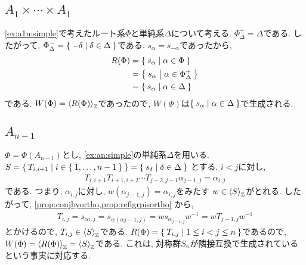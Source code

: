 \subsection{$A_{1}\times\cdots\times A_{1}$}
\cref{ex:a1n:simple}で考えたルート系$\Phi$と単純系$\Delta$について考える.
$\Phi_\Delta^+=\Delta$である.
したがって, $\Phi_\Delta^-=\Set{-\delta|\delta\in\Delta}$である.
$s_\alpha=s_{-\alpha}$であったから,
\begin{align*}
  R(\Phi)
  &=\Set{s_\alpha|\alpha\in\Phi}\\
  &=\Set{s_\alpha|\alpha\in\Phi_\Delta^+}\\
  &=\Set{s_\alpha|\alpha\in\Delta}
\end{align*}
である. $W(\Phi)=\Braket{R(\Phi)}_{\mathbb{Z}}$であったので,
$W(\Phi)$は$\Set{s_\alpha|\alpha\in\Delta}$で生成される.




\subsection{$A_{n-1}$}
\label{ex:an:simplesgens}
$\Phi=\Phi(A_{n-1})$とし,
\cref{ex:an:simple}の単純系$\Delta$を用いる.
$S=\Set{T_{i,i+1}|i\in\Set{1,\ldots,n-1}}=\Set{s_\delta|\delta\in\Delta}$
とする.
$i<j$に対し,
\begin{align*}
T_{i,i+1}T_{i+1,i+2}\cdots T_{j-2,j-1} \alpha_{j-1,j}=\alpha_{i,j}
\end{align*}
である. つまり, $\alpha_{i,j}$に対し,
$w(\alpha_{j-1,j})=\alpha_{i,j}$をみたす
$w\in \Braket{S}_{\mathbb{Z}}$がとれる.
したがって,
\cref{prop:conjbyortho,prop:reflgrpisortho}
から,
\begin{align*}
T_{i,j}=s_{\alpha{i,j}}=s_{w(\alpha{j-1,j})}=ws_{\alpha_{j-1,j}}w^{-1}=wT_{j-1,j}w^{-1}
\end{align*}
とかけるので, $T_{i,j}\in \Braket{S}_{\mathbb{Z}}$である.
$R(\Phi)=\Set{T_{i,j}|1\leq i<j\leq n}$であるので,
$W(\Phi)=\Braket{R(\Phi)}_{\mathbb{Z}}=\Braket{S}_{\mathbb{Z}}$である.
これは, 対称群$S_n$が隣接互換で生成されているという事実に対応する.

